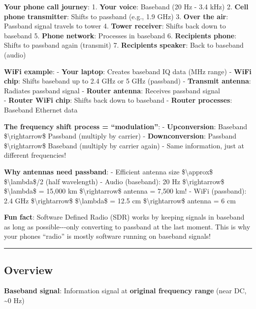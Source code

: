 \textbf{Your phone call journey}: 1. \textbf{Your voice}: Baseband (20
Hz - 3.4 kHz) 2. \textbf{Cell phone transmitter}: Shifts to passband
(e.g., 1.9 GHz) 3. \textbf{Over the air}: Passband signal travels to
tower 4. \textbf{Tower receiver}: Shifts back down to baseband 5.
\textbf{Phone network}: Processes in baseband 6.
\textbf{Recipient\textquotesingle s phone}: Shifts to passband again
(transmit) 7. \textbf{Recipient\textquotesingle s speaker}: Back to
baseband (audio)

\textbf{WiFi example}: - \textbf{Your laptop}: Creates baseband IQ data
(MHz range) - \textbf{WiFi chip}: Shifts baseband up to 2.4 GHz or 5 GHz
(passband) - \textbf{Transmit antenna}: Radiates passband signal -
\textbf{Router antenna}: Receives passband signal\\
- \textbf{Router WiFi chip}: Shifts back down to baseband -
\textbf{Router processes}: Baseband Ethernet data

\textbf{The frequency shift process = ``modulation''}: -
\textbf{Upconversion}: Baseband \$\textbackslash rightarrow\$ Passband
(multiply by carrier) - \textbf{Downconversion}: Passband
\$\textbackslash rightarrow\$ Baseband (multiply by carrier again) -
Same information, just at different frequencies!

\textbf{Why antennas need passband}: - Efficient antenna size
\$\textbackslash approx\$ \$\textbackslash lambda\$/2 (half wavelength)
- Audio (baseband): 20 Hz \$\textbackslash rightarrow\$
\$\textbackslash lambda\$ = 15,000 km \$\textbackslash rightarrow\$
antenna = 7,500 km! - WiFi (passband): 2.4 GHz
\$\textbackslash rightarrow\$ \$\textbackslash lambda\$ = 12.5 cm
\$\textbackslash rightarrow\$ antenna = 6 cm

\textbf{Fun fact}: Software Defined Radio (SDR) works by keeping signals
in baseband as long as possible-\/-\/-only converting to passband at the
last moment. This is why your phone\textquotesingle s ``radio'' is
mostly software running on baseband signals!

\begin{center}\rule{0.5\linewidth}{0.5pt}\end{center}

\subsection{Overview}\label{overview}

\textbf{Baseband signal}: Information signal at \textbf{original
frequency range} (near DC, \textasciitilde0 Hz)

